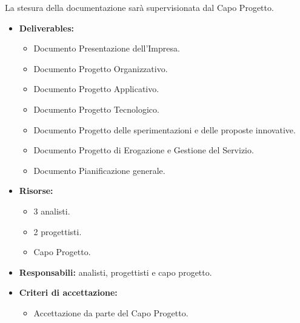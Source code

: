                 
                La stesura della documentazione sarà supervisionata dal Capo Progetto.
                \begin{itemize}
               		\item  \textbf{Deliverables:} 
                    \begin{itemize}
                    	\item Documento Presentazione dell'Impresa.
                        \item Documento Progetto Organizzativo.
                        \item Documento Progetto Applicativo.
                        \item Documento Progetto Tecnologico.
                        \item Documento Progetto delle sperimentazioni e delle proposte innovative.
                        \item Documento Progetto di Erogazione e Gestione del Servizio.
                        \item Documento Pianificazione generale.
                    \end{itemize}
                                       
                    \item  \textbf{Risorse:} 
                	\begin{itemize}
                		\item 3 analisti.
                        \item 2 progettisti.
                        \item Capo Progetto.
                	\end{itemize}
                    \item  \textbf{Responsabili:} analisti, progettisti e capo progetto.
                    \item  \textbf{Criteri di accettazione:} 
                    \begin{itemize}
                    	\item Accettazione da parte del Capo Progetto.
                    \end{itemize}
                	\end{itemize}
                    
